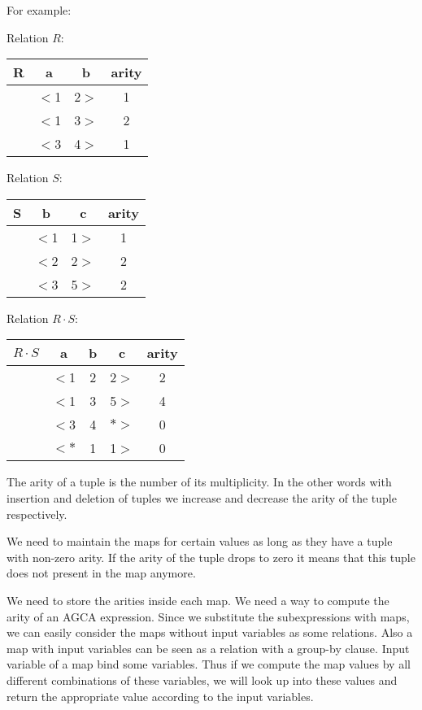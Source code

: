 \documentclass[12pt]{article}
\begin{document}
For example:

Relation $R$:
\begin{table}[ht]
\centering
\begin{tabular}{c c c c}
	R & a & b & arity\\ [0.2ex]
	\hline
	  & $<$1 & 2$>$ & 1 \\
	  & $<$1 & 3$>$ & 2 \\
	  & $<$3 & 4$>$ & 1 \\
\end{tabular}
\end{table}

Relation $S$:
\begin{table}[ht]
\centering
\begin{tabular}{c c c c}
	S & b & c & arity\\ [0.2ex]
	\hline
	  & $<$1 & 1$>$ & 1 \\
	  & $<$2 & 2$>$ & 2 \\
	  & $<$3 & 5$>$ & 2 \\
\end{tabular}
\end{table}

Relation $R\cdot S$:
\begin{table}[ht]
\centering
\begin{tabular}{c c c c c}
	$R\cdot S$ & a & b & c & arity\\ [0.2ex]
	\hline
	  & $<$1 & 2 & 2$>$ & 2 \\
	  & $<$1 & 3 & 5$>$ & 4 \\
	  & $<$3 & 4 & $*>$ & 0 \\
	  & $<*$ & 1 & 1$>$ & 0 \\
\end{tabular}
\end{table}
The arity of a tuple is the number of its multiplicity. In the other words with insertion and deletion of tuples we increase and decrease the arity of the tuple respectively. \\
\par
We need to maintain the maps for certain values as long as they have a tuple with non-zero arity. If the arity of the tuple drops to zero it means that this tuple does not present in the map anymore. 
\par
We need to store the arities inside each map. We need a way to compute the arity of an AGCA expression. Since we substitute the subexpressions with maps, we can easily consider the maps without input variables as some relations. Also a map with input variables can be seen as a relation with a group-by clause. Input variable of a map bind some variables. Thus if we compute the map values by all different combinations of these variables, we will look up into these values and return the appropriate value according to the input variables.  
\end{document}
